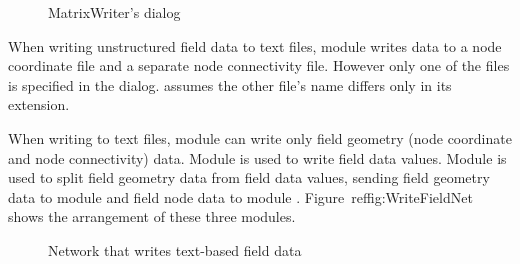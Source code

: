 \begin{figure}[htb]
  \centering
  \begin{makeimage} \end{makeimage}
  \MatrixWriterGUI
  \caption{\label{fig:MatrixWriterGUI} MatrixWriter's dialog}
\end{figure}

When writing unstructured field data to text files, module 
writes data to a node coordinate file and a separate node connectivity
file.  However only one of the files is specified in the dialog.
 assumes the other file's name differs only in its
extension.

When writing to text files, module  can write only
field geometry (node coordinate and node connectivity) data.  Module
 is used to write field data values.  Module
 is used to split field geometry data from
field data values, sending field geometry data to module
 and field node data to module
.  Figure~ref{fig:WriteFieldNet} shows the
arrangement of these three modules.

\begin{figure}[htb]
  \centering
  \begin{makeimage} \end{makeimage}
  \WriteFieldNet
  \caption{\label{fig:WriteFieldNet} Network that writes text-based field data}
\end{figure}




